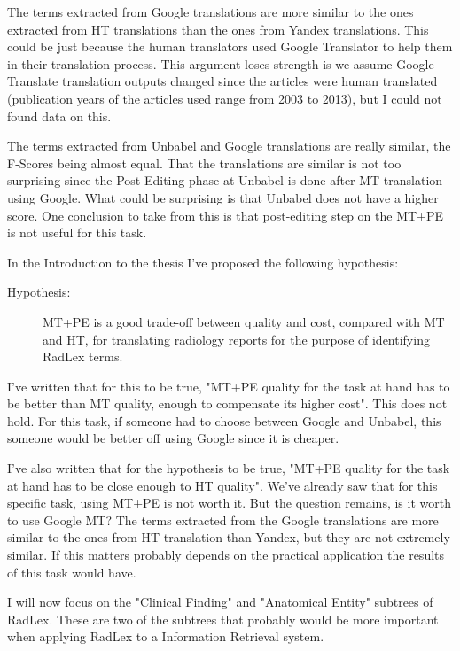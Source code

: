 The terms extracted from Google translations are more similar to the ones extracted from HT translations than the ones from Yandex translations. This could be just because the human translators used Google Translator to help them in their translation process. This argument loses strength is we assume Google Translate translation outputs changed since the articles were human translated (publication years of the articles used range from 2003 to 2013), but I could not found  data on this. 

The terms extracted from Unbabel and Google translations are really similar, the F-Scores being almost equal. That the translations are similar is not too surprising since the Post-Editing phase at Unbabel is done after MT translation using Google. What could be surprising is that Unbabel does not have a higher score. One conclusion to take from this is that post-editing step on the MT+PE is not useful for this task. 

In the Introduction to the thesis I've proposed the following hypothesis:

\begin{description}
	\item[Hypothesis:] MT+PE is a good trade-off between quality and cost, compared with MT and HT, for translating radiology reports for the purpose of identifying RadLex terms. 
\end{description}

I've written that for this to be true, "MT+PE quality for the task at hand has to be better than MT quality, enough to compensate its higher cost". This does not hold. For this task, if someone had to choose between Google and Unbabel, this someone would be better off using Google since it is cheaper. 

I've also written that for the hypothesis to be true, "MT+PE quality for the task at hand has to be close enough to HT quality". We've already saw that for this specific task, using MT+PE is not worth it. But the question remains, is it worth to use Google MT? The terms extracted from the Google translations are more similar to the ones from HT translation than Yandex, but they are not extremely similar. If this matters probably depends on the practical application the results of this task would have. 

I will now focus on the "Clinical Finding" and "Anatomical Entity" subtrees of RadLex. These are two of the subtrees that probably would be more important when applying RadLex to a Information Retrieval system. 


